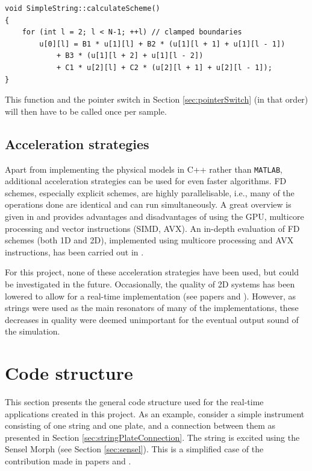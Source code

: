 \begin{lstlisting}[belowskip=-0.5\baselineskip]
void SimpleString::calculateScheme()
{
    for (int l = 2; l < N-1; ++l) // clamped boundaries
        u[0][l] = B1 * u[1][l] + B2 * (u[1][l + 1] + u[1][l - 1]) 
            + B3 * (u[1][l + 2] + u[1][l - 2])         
            + C1 * u[2][l] + C2 * (u[2][l + 1] + u[2][l - 1]);
}
\end{lstlisting}
This function and the pointer switch in Section \ref{sec:pointerSwitch} (in that order) will then have to be called once per sample.

\subsection{Acceleration strategies}
Apart from implementing the physical models in C++ rather than \texttt{MATLAB}, additional acceleration strategies can be used for even faster algorithms. FD schemes, especially explicit schemes, are highly parallelisable, i.e., many of the operations done are identical and can run simultaneously. A great overview is given in \cite{Bilbao2019CMJb} and provides advantages and disadvantages of using the GPU, multicore processing and vector instructions (SIMD, AVX). An in-depth evaluation of FD schemes (both 1D and 2D), implemented using multicore processing and AVX instructions, has been carried out in \cite{Webb2015}.

For this project, none of these acceleration strategies have been used, but could be investigated in the future. Occasionally, the quality of 2D systems has been lowered to allow for a real-time implementation (see papers \citeP[A] and \citeP[D]). However, as strings were used as the main resonators of many of the implementations, these decreases in quality were deemed unimportant for the eventual output sound of the simulation.

\section{Code structure}\label{sec:codeStructure}
This section presents the general code structure used for the real-time applications created in this project. As an example, consider a simple instrument consisting of one string and one plate, and a connection between them as presented in Section \ref{sec:stringPlateConnection}. The string is excited using the Sensel Morph (see Section \ref{sec:sensel}). This is a simplified case of the contribution made in papers \citeP[A] and \citeP[B]. 

